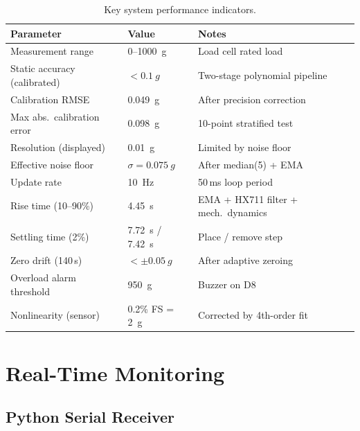 \documentclass[12pt,a4paper]{article}
\begin{document}
\begin{table}[H]
\centering
\caption{Key system performance indicators.}
\label{tab:kpi}
\begin{tabular}{@{}lll@{}}
\toprule
\textbf{Parameter} & \textbf{Value} & \textbf{Notes} \\
\midrule
Measurement range              & 0--\SI{1000}{g}               & Load cell rated load \\
Static accuracy (calibrated)   & $<\SI{0.1}{g}$                & Two-stage polynomial pipeline \\
Calibration RMSE               & \SI{0.049}{g}                 & After precision correction \\
Max abs.\ calibration error    & \SI{0.098}{g}                 & 10-point stratified test \\
Resolution (displayed)         & \SI{0.01}{g}                  & Limited by noise floor \\
Effective noise floor          & $\sigma = \SI{0.075}{g}$      & After median(5) + EMA \\
Update rate                    & \SI{10}{Hz}                   & 50\,ms loop period \\
Rise time (10--90\%)           & \SI{4.45}{s}                  & EMA + HX711 filter + mech.\ dynamics \\
Settling time (2\%)            & \SI{7.72}{s} / \SI{7.42}{s}  & Place / remove step \\
Zero drift (140\,s)            & $<\pm\SI{0.05}{g}$            & After adaptive zeroing \\
Overload alarm threshold       & \SI{950}{g}                   & Buzzer on D8 \\
Nonlinearity (sensor)          & 0.2\% FS = \SI{2}{g}          & Corrected by 4th-order fit \\
\bottomrule
\end{tabular}
\end{table}

\section{Real-Time Monitoring}

\subsection{Python Serial Receiver}
\end{document}
